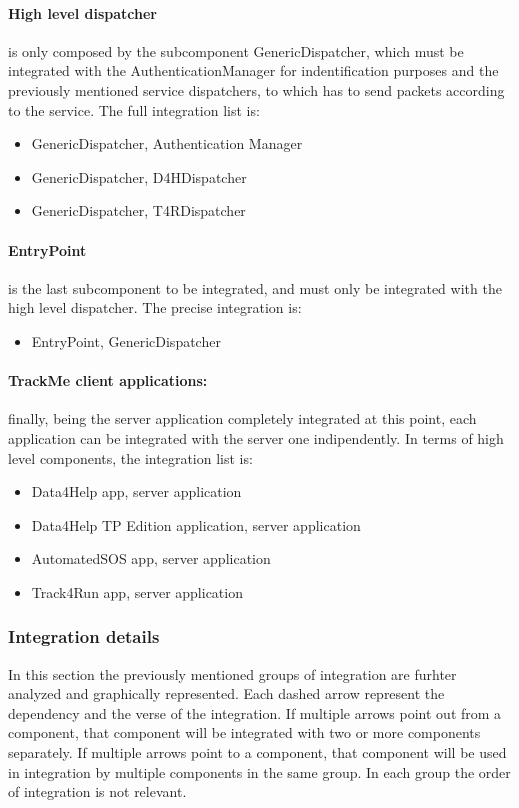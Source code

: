 \paragraph{High level dispatcher} is only composed by the subcomponent GenericDispatcher, which must be integrated with the AuthenticationManager for indentification purposes and the previously mentioned service dispatchers, to which has to send packets according to the service. The full integration list is:
\begin{itemize}
\item GenericDispatcher, Authentication Manager
\item GenericDispatcher, D4HDispatcher
\item GenericDispatcher, T4RDispatcher
\end{itemize}

\paragraph{EntryPoint} is the last subcomponent to be integrated, and must only be integrated with the high level dispatcher. The precise integration is:
\begin{itemize}
\item EntryPoint, GenericDispatcher
\end{itemize}

\paragraph{TrackMe client applications:} finally, being the server application completely integrated at this point, each application can be integrated with the server one indipendently. In terms of high level components, the integration list is:
\begin{itemize}
\item Data4Help app, server application
\item Data4Help TP Edition application, server application
\item AutomatedSOS app, server application
\item Track4Run app, server application
\end{itemize}

{\color{secblue}\subsubsection{Integration details}}
In this section the previously mentioned groups of integration are furhter analyzed and graphically represented.
\newline Each dashed arrow represent the dependency and the verse of the integration. If multiple arrows point out from a component, that component will be integrated with two or more components separately. If multiple arrows point to a component, that component will be used in integration by multiple components in the same group.
In each group the order of integration is not relevant.\newline


